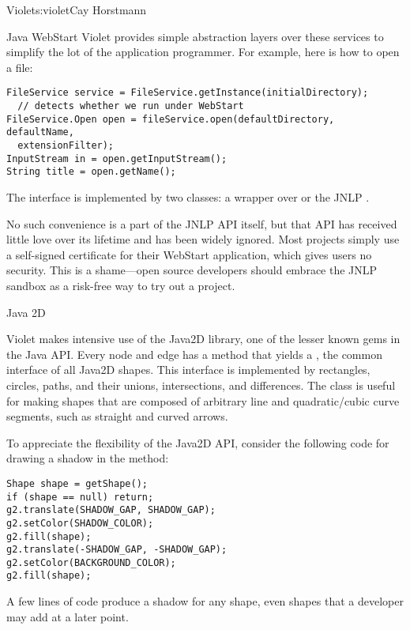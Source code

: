 \begin{aosachapter}{Violet}{s:violet}{Cay Horstmann}
\begin{aosasect1}{Java WebStart}
Violet provides simple abstraction layers over these services to
simplify the lot of the application programmer. For example, here is
how to open a file:

\begin{verbatim}
FileService service = FileService.getInstance(initialDirectory);
  // detects whether we run under WebStart
FileService.Open open = fileService.open(defaultDirectory, defaultName, 
  extensionFilter);
InputStream in = open.getInputStream();
String title = open.getName();
\end{verbatim}

\noindent The  interface is implemented by two classes: a
wrapper over  or the JNLP .

No such convenience is a part of the JNLP API itself, but that API has
received little love over its lifetime and has been widely
ignored. Most projects simply use a self-signed certificate for their
WebStart application, which gives users no security. This is a
shame---open source developers should embrace the JNLP sandbox as a
risk-free way to try out a project.

\end{aosasect1}

\begin{aosasect1}{Java 2D}

Violet makes intensive use of the Java2D library, one of the lesser
known gems in the Java API\@. Every node and edge has a method
 that yields a , the common
interface of all Java2D shapes. This interface is implemented by
rectangles, circles, paths, and their unions, intersections, and
differences. The  class is useful for making shapes
that are composed of arbitrary line and quadratic/cubic curve
segments, such as straight and curved arrows.

To appreciate the flexibility of the Java2D API, consider the
following code for drawing a
shadow in the  method:

\begin{verbatim}
Shape shape = getShape();
if (shape == null) return;
g2.translate(SHADOW_GAP, SHADOW_GAP);
g2.setColor(SHADOW_COLOR);
g2.fill(shape);
g2.translate(-SHADOW_GAP, -SHADOW_GAP);
g2.setColor(BACKGROUND_COLOR);
g2.fill(shape);
\end{verbatim}

\noindent A few lines of code produce a shadow for any shape, even shapes that a
developer may add at a later point.


\end{aosasect1}
\end{aosachapter}
